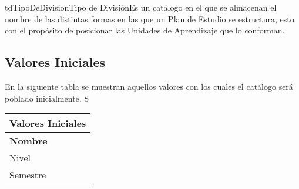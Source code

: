 \begin{TipoDeDato}{tdTipoDeDivision}{Tipo de División}{Es un catálogo en el que se almacenan el nombre de las distintas formas en las que un Plan de Estudio se estructura, esto con el propósito de posicionar las Unidades de Aprendizaje que lo conforman. }

	\begin{tdAtributos}
	\end{tdAtributos}

	\subsection{Valores Iniciales}
	En la siguiente tabla se muestran aquellos valores con los cuales el catálogo será poblado inicialmente. S\cdtEmpty
		
		\begin{longtable}{| p{}| }
	 			\rowcolor{colorPrincipal}
	 			\bf \color{white} Valores Iniciales\\
	 			\hline
	 			\rowcolor{colorSecundario}
	 			\bf \color{white} Nombre  \\
	 			\hline
	 			Nivel\\
	 			\hline
	 			Semestre\\
	 			\hline
	 		\end{longtable}
\end{TipoDeDato}


